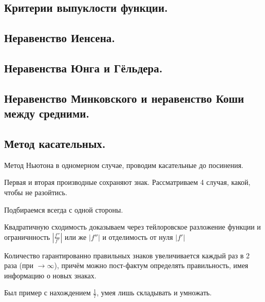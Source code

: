 \documentclass[12pt, a4paper]{article}
\begin{document}
\subsection{Критерии выпуклости функции.}

\subsection{Неравенство Иенсена.}

\subsection{Неравенства Юнга и Гёльдера.}

\subsection{Неравенство Минковского и неравенство Коши между средними.}

\subsection{Метод касательных.}

Метод Ньютона в одномерном случае, проводим касательные до посинения.

Первая и вторая производные сохраняют знак. 
Рассматриваем 4 случая, какой, чтобы не разойтись.

Подбираемся всегда с одной стороны.

Квадратичную сходимость доказываем через тейлоровское разложение функции 
и ограничнность $\left| \frac{f''}{f'} \right|$ или же $\left| f'' \right|$ и отделимость от нуля $\left| f' \right|$

Количество гарантированно правильных знаков увеличивается каждый раз в 2 раза (при $\rightarrow \infty$), причём можно пост-фактум определять правильность, имея информацию о новых знаках.

Был пример с нахождением $\frac{1}{7}$, умея лишь складывать и умножать.
\end{document}
